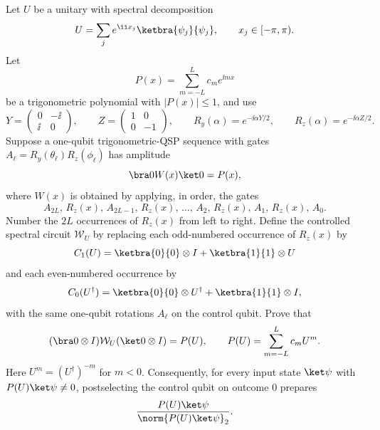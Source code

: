 Let $U$ be a unitary with spectral decomposition
$$
    U=\sum_j e^{\ii x_j}\ketbra{\psi_j}{\psi_j},
    \qquad x_j\in[-\pi,\pi).
$$
Let
$$
    P(x)=\sum_{m=-L}^{L}c_m e^{\ii mx}
$$
be a trigonometric polynomial with $|P(x)|\leq1$, and use
$$
    Y=\begin{pmatrix}0&-\ii\\ \ii&0\end{pmatrix},
    \qquad
    Z=\begin{pmatrix}1&0\\0&-1\end{pmatrix},
    \qquad
    R_y(\alpha)=e^{-\ii\alpha Y/2},
    \qquad
    R_z(\alpha)=e^{-\ii\alpha Z/2}.
$$
Suppose a one-qubit trigonometric-QSP sequence with gates $A_\ell=R_y(\theta_\ell)R_z(\phi_\ell)$ has amplitude
$$
    \bra0 W(x)\ket0=P(x),
$$
where $W(x)$ is obtained by applying, in order, the gates
$$
    A_{2L},\,R_z(x),\,A_{2L-1},\,R_z(x),\,\ldots,\,
    A_2,\,R_z(x),\,A_1,\,R_z(x),\,A_0 .
$$
Number the $2L$ occurrences of $R_z(x)$ from left to right.  Define the controlled spectral circuit $\mathcal W_U$ by replacing each odd-numbered occurrence of $R_z(x)$ by
$$
    C_1(U)=\ketbra{0}{0}\otimes I+\ketbra{1}{1}\otimes U
$$
and each even-numbered occurrence by
$$
    C_0(U^\dagger)=\ketbra{0}{0}\otimes U^\dagger+\ketbra{1}{1}\otimes I,
$$
with the same one-qubit rotations $A_\ell$ on the control qubit.  Prove that
$$
    (\bra0\otimes I)\mathcal W_U(\ket0\otimes I)=P(U),
    \qquad
    P(U)=\sum_{m=-L}^{L}c_m U^m .
$$
Here $U^m=(U^\dagger)^{-m}$ for $m<0$.
Consequently, for every input state $\ket\psi$ with $P(U)\ket\psi\neq0$, postselecting the control qubit on outcome $0$ prepares
$$
    \frac{P(U)\ket\psi}{\norm{P(U)\ket\psi}_2} .
$$
